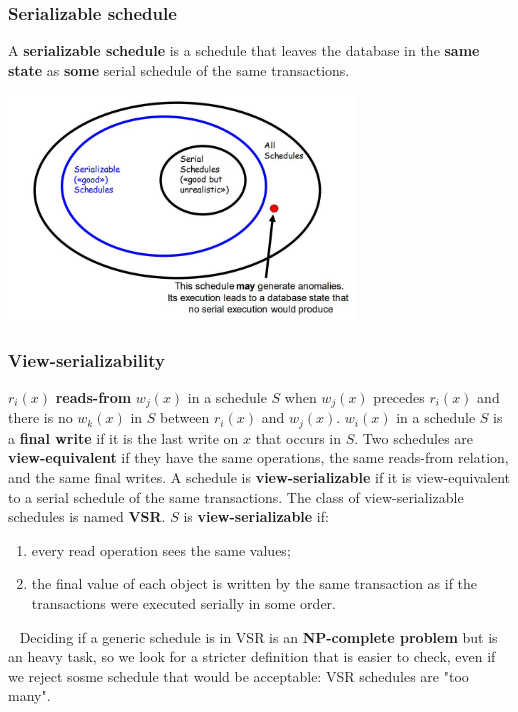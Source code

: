 \subsubsection{Serializable schedule}
A \textbf{serializable schedule} is a schedule that leaves the database in the \textbf{same state} as \textbf{some} serial schedule of the same transactions.
\begin{center}
    \includegraphics[height=6cm]{../arguments/serializableSchedules.JPG}
\end{center}
\subsubsection{View-serializability}
$r_i(x)$ \textbf{reads-from} $w_j(x)$ in a schedule $S$ when $w_j(x)$ precedes $r_i(x)$ and there is no $w_k(x)$ in $S$ between $r_i(x)$ and $w_j(x)$.\newline
\newline
$w_i(x)$ in a schedule $S$ is a \textbf{final write} if it is the last write on $x$ that occurs in $S$.\newline
\newline
Two schedules are \textbf{view-equivalent} if they have the same operations, the same reads-from relation, and the same final writes.\newline
\newline
A schedule is \textbf{view-serializable} if it is view-equivalent to a serial schedule of the same transactions.\newline
The class of view-serializable schedules is named \textbf{VSR}.\newline
$S$ is \textbf{view-serializable} if:
\begin{enumerate}
    \item every read operation sees the same values;
    \item the final value of each object is written by the same transaction as if the transactions were executed serially in some order.
\end{enumerate}
\ \newline
Deciding if a generic schedule is in VSR is an \textbf{NP-complete problem} but is an heavy task, so we look for a stricter definition that is easier to check, even if we reject sosme schedule that would be acceptable: VSR schedules are "too many".
